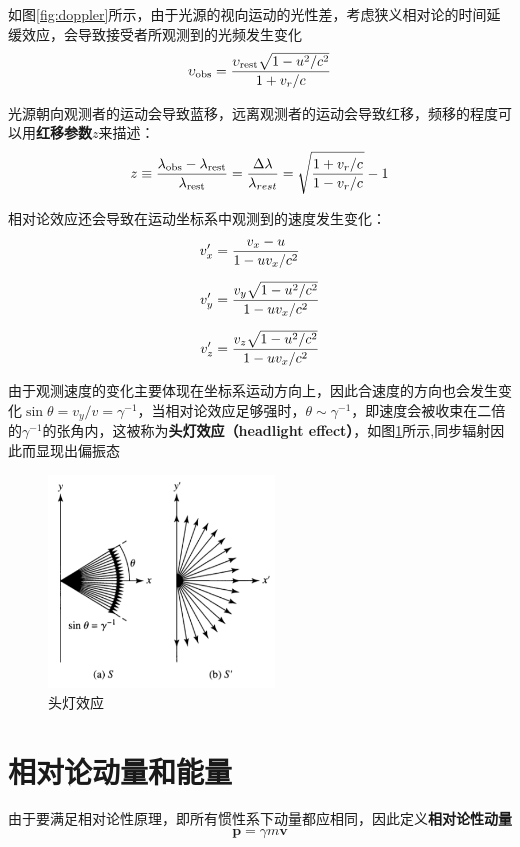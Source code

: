\documentclass[openany]{ctexbook}
\begin{document}
如图\ref{fig:doppler}所示，由于光源的视向运动的光性差，考虑狭义相对论的时间延缓效应，会导致接受者所观测到的光频发生变化
\begin{equation}
  \upsilon_\mathrm{obs}={\upsilon_\mathrm{rest}\sqrt{1-u^2/c^2}\over 1+v_r/c}
  \label{eq:doppler}
\end{equation}

光源朝向观测者的运动会导致蓝移，远离观测者的运动会导致红移，频移的程度可以用\textbf{红移参数}$z$来描述：
\begin{equation}
  z\equiv{\lambda_\mathrm{obs}-\lambda_\mathrm{rest}\over \lambda_\mathrm{rest}}={\Delta\lambda \over \lambda_{rest}}=\sqrt{{1+v_r/c \over 1-v_r/c}}-1
\end{equation}

相对论效应还会导致在运动坐标系中观测到的速度发生变化：
\begin{align}
  v_x' &={v_x-u \over 1-uv_x/c^2}\\[2mm]
  v_y' &={v_y\sqrt{1-u^2/c^2} \over 1-uv_x/c^2}\\[2mm]
  v_z' &={v_z\sqrt{1-u^2/c^2} \over 1-uv_x/c^2}
\end{align}

由于观测速度的变化主要体现在坐标系运动方向上，因此合速度的方向也会发生变化$\sin\theta={v_y /v}=\gamma^{-1}$，当相对论效应足够强时，$\theta\sim\gamma^{-1}$，即速度会被收束在二倍的$\gamma^{-1}$的张角内，这被称为\textbf{头灯效应（headlight effect）}，如图\ref{fig:beaming}所示,同步辐射因此而显现出偏振态

\begin{figure}[hbt]
  \centering
  \includegraphics[width=6cm]{chapters/05/beaming}
  \caption{头灯效应}
  \label{fig:beaming}
\end{figure}


\section{相对论动量和能量}
由于要满足相对论性原理，即所有惯性系下动量都应相同，因此定义\textbf{相对论性动量}
\begin{equation}
  \mathbf p=\gamma m \mathbf v
\end{equation}
\end{document}
